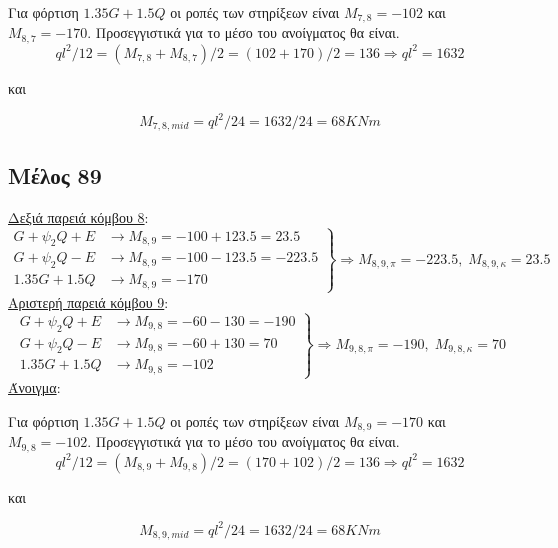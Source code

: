 \medskip
\noindent
Για φόρτιση \(1.35G + 1.5Q\) οι ροπές των στηρίξεων είναι \(M_{7,8} = -102\) και \(M_{8,7} = -170\). Προσεγγιστικά για το μέσο του ανοίγματος θα είναι.
\[
ql^2/12 = \left(M_{7,8} + M_{8,7}\right)/2 = \left(102 + 170\right)/2 = 136 \Rightarrow ql^2 = 1632
\]

\noindent
και

\[
M_{7,8,mid} = ql^2/24 = 1632/24 = 68 KNm
\]

\subsection{Μέλος 89}
\noindent
\underline{Δεξιά παρειά κόμβου 8}:
\[
\left.
   \begin{array}{ll}
       G+\psi_2 Q + Ε & \rightarrow M_{8,9} = -100+123.5 = 23.5 \\
       G+\psi_2 Q - Ε & \rightarrow M_{8,9} = -100-123.5 = -223.5 \\
       1.35G + 1.5Q     & \rightarrow M_{8,9} = -170
   \end{array}
\right \} \Rightarrow M_{8,9,\pi} = -223.5,\; M_{8,9,\kappa} = 23.5
\]
\noindent
\underline{Αριστερή παρειά κόμβου 9}:
\[
\left.
   \begin{array}{ll}
       G+\psi_2 Q + Ε & \rightarrow M_{9,8} = -60-130 = -190 \\
       G+\psi_2 Q - Ε & \rightarrow M_{9,8} = -60+130 = 70 \\
       1.35G + 1.5Q     & \rightarrow M_{9,8} = -102
   \end{array}
\right \} \Rightarrow M_{9,8,\pi} = -190,\; M_{9,8,\kappa} = 70
\]
\noindent
\underline{Άνοιγμα}:

\medskip
\noindent
Για φόρτιση \(1.35G + 1.5Q\) οι ροπές των στηρίξεων είναι \(M_{8,9} = -170\) και \(M_{9,8} = -102\). Προσεγγιστικά για το μέσο του ανοίγματος θα είναι.
\[
ql^2/12 = \left(M_{8,9} + M_{9,8}\right)/2 = \left(170 + 102\right)/2 = 136 \Rightarrow ql^2 = 1632
\]

\noindent
και

\[
M_{8,9,mid} = ql^2/24 = 1632/24 = 68 KNm
\]
